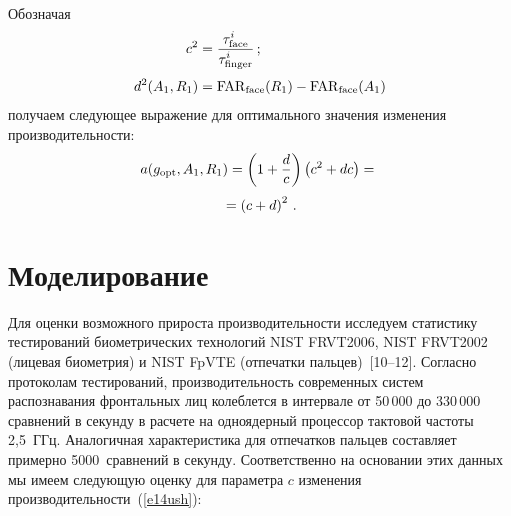 \begin{multicols}{2}
\begin{figure*} %
\vspace*{1pt}
\begin{center}
\mbox{%
\epsfxsize=166.305mm
}
\end{center}
\vspace*{-12pt}
\vspace*{12pt}
\end{figure*}

     Обозначая 
     \begin{align*}
     c^2 &= \displaystyle\frac{\displaystyle \tau^i_{\mathrm{face}}\mathstrut}{\displaystyle \tau^i_{\mathrm{finger}}\mathstrut}\,;\\[3pt]
     d^2(A_1, R_1) &= \mathrm{FAR}_{\mathrm{face}} (R_1) -\mathrm{FAR}_{\mathrm{face}}(A_1)
     \end{align*}
получаем следующее выражение для оптимального значения изменения
производительности:
     \begin{multline}
     a(g_{\mathrm{opt}}, A_1, R_1 ) = \left ( 1+\displaystyle\frac{\displaystyle d\mathstrut}{\displaystyle c\mathstrut}\right ) \left ( c^2+dc\right ) ={}\\[3pt]
     {}=
\left ( c+d\right )^2\,.
     \label{e14ush}
     \end{multline}

     \section{Моделирование}

     Для оценки возможного прироста производительности исследуем статистику
тестирований биометрических технологий NIST FRVT2006, \mbox{NIST} \mbox{FRVT2002} (лицевая
биометрия) и \mbox{NIST} \mbox{FpVTE} (отпечатки пальцев)~[10--12]. Согласно протоколам
тес\-ти\-ро\-ва\-ний, производительность современных сис\-тем распознавания фронтальных
лиц %
 колеб\-лет\-ся в интервале от 50\,000 до 330\,000 сравнений в секунду в расчете на
одноядерный процессор тактовой частоты 2,5~ГГц. Аналогичная характеристика для
отпечатков пальцев составляет примерно 5000~сравнений в секунду. Соответственно
на основании этих данных мы имеем следующую оценку для параметра $c$ изменения
про\-из\-во\-ди\-тель\-ности~(\ref{e14ush}):


\end{multicols}
